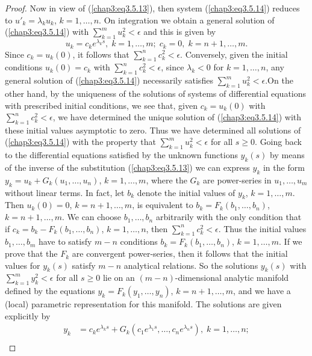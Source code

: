 \begin{proof}
Now in view of (\ref{chap3:eq3.5.13}), then system
(\ref{chap3:eq3.5.14}) reduces to $u'_k = \lambda_k u_k$, $k=1,\ldots,
n$. On integration we obtain a general solution of
(\ref{chap3:eq3.5.14}) with $\sum\limits^m_{k=1} u^2_k < \epsilon$ and
this is given by 
$$
u_k = c_k e^{\lambda_k s}, \; k =1, \ldots, m; \; c_k = 0, \; k = n+1,
\ldots, m.  
$$
Since $c_k = u_k(0)$, it follows that $\sum\limits^n_{k=1} c^2_k
<\epsilon$. Conversely, given the initial conditions $u_k(0) = c_k$
with $\sum\limits^n_{k=1}c^2_k < \epsilon$, since $\lambda_k < 0$ for
$k = 1, \ldots, n$, any general solution of (\ref{chap3:eq3.5.14})
necessarily satisfies $\sum\limits^m_{k=1} u^2_k <
\epsilon$.\pageoriginale On the other hand, by the uniqueness of the
solutions of systems of differential equations with  prescribed
initial conditions, we see that, given $c_k = u_k(0)$ with
$\sum\limits^n_{k=1} c^2_k < \epsilon$, we have determined the unique
solution of (\ref{chap3:eq3.5.14}) with these initial values
asymptotic to zero. Thus we have determined all solutions of
(\ref{chap3:eq3.5.14}) with the property that $\sum\limits^m_{k=1}
u^2_k <\epsilon$ for all $s \geq 0$. Going back to the differential
equations satisfied by the unknown functions $y_k(s)$ by means of the
inverse of the substitution (\ref{chap3:eq3.5.13}) we can express
$y_k$ in the form $y_k = u_k + G_k (u_1, \ldots, u_n)$, $k =1 ,
\ldots, m$, where the $G_k$ are power-series in $u_1, \ldots, u_m$
without linear terms. In fact, let $b_k$ denote the initial values of
$y_k$, $k = 1, \ldots, m$. Then $u_k(0) = 0$, $k = n+1, \ldots,m$, is
equivalent to $b_k = F_k (b_1,\ldots, b_n)$, $k = n + 1, \ldots,
m$. We can choose $b_1, \ldots, b_n$ arbitrarily with the only
condition that if $c_k = b_k - F_k (b_1, \ldots, b_n)$, $k = 1,
\ldots, n$, then $\sum\limits^n_{k=1} c^2_k < \epsilon$. Thus the
initial values $b_1, \ldots, b_m$ have to satisfy $m-n$ conditions
$b_k = F_k(b_1, \ldots, b_n)$, $k =1, \ldots, m$. If we prove that the
$F_k$ are convergent power-series, then it follows that the initial
values for $y_k(s)$ satisfy $m-n$ analytical relations. So the
solutions $y_k(s)$ with $\sum\limits^m_{k=1} y^2_k < \epsilon$ for all
$s \geq 0$ lie on an $(m-n)$-dimensional analytic manifold defined by
the equations $y_k = F_k (y_1, \ldots,y_n)$, $k =n+1, \ldots, m$, and
we have a (local) parametric representation for this manifold. The
solutions are given explicitly by  
\begin{align*}
y_k & = c_k e^{\lambda_k s} + G_k (c_1 e^{\lambda_1 s}, \ldots, c_n
e^{\lambda_ns}),\; k=1, \ldots, n;\\ 

\end{align*}
\end{proof}
